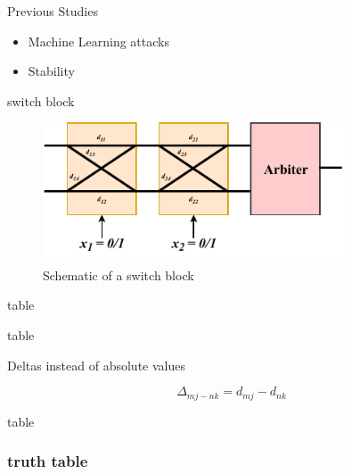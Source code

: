 \documentclass[10pt, compress]{beamer}
\begin{document}
\begin{frame}{Previous Studies}
	\begin{itemize}
		\item Machine Learning attacks
        \item Stability
	\end{itemize}
\end{frame}


\begin{frame}{switch block}
    \begin{figure}
        \centering
        \includegraphics[width=0.8\textwidth]{figures/2_switch_blocks_paths.pdf}
        \caption{Schematic of a switch block}
    \end{figure}
\end{frame}


\begin{frame}{table}

  
  
\end{frame}


\begin{frame}{table}

    \begin{center}
        Deltas instead of absolute values
    \end{center}
    \[ \Delta_{mj-nk} = d_{mj} - d_{nk} \]

\end{frame}


\begin{frame}{table}

  
  
\end{frame}


\begin{frame}[fragile]
  \frametitle{truth table}
  
  
  
\end{frame}
\end{document}
